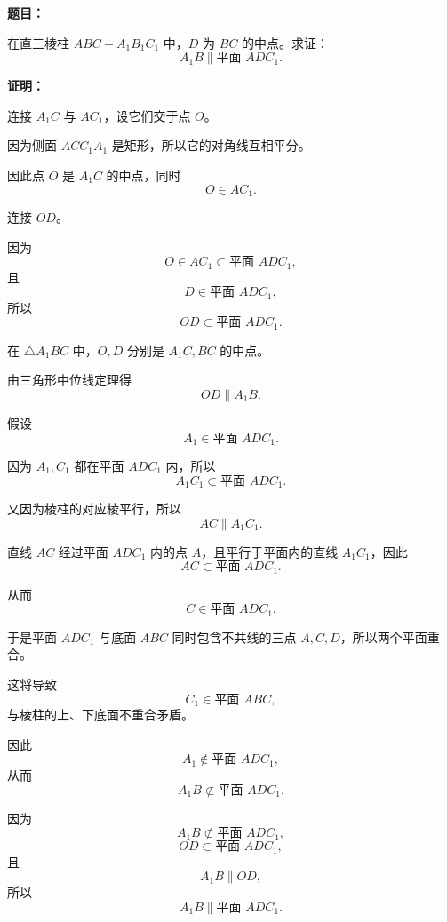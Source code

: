 \begin{examplebox}
	\textbf{题目：}

	在直三棱柱 $ABC-A_1B_1C_1$ 中，$D$ 为 $BC$ 的中点。求证：
	\[
		A_1B\parallel\text{平面 }ADC_1.
	\]

	\textbf{证明：}

	\begin{description}[
			style=nextline,
			leftmargin=2.8em,
			labelsep=0.5em,
			itemsep=0.45em
		]
		\item[\textbf{第一步（构造面内参照线）：}]
		      连接 $A_1C$ 与 $AC_1$，设它们交于点 $O$。

		      因为侧面 $ACC_1A_1$ 是矩形，所以它的对角线互相平分。

		      因此点 $O$ 是 $A_1C$ 的中点，同时
		      \[
			      O\in AC_1.
		      \]

		      连接 $OD$。

		      因为
		      \[
			      O\in AC_1\subset\text{平面 }ADC_1,
		      \]
		      且
		      \[
			      D\in\text{平面 }ADC_1,
		      \]
		      所以
		      \[
			      OD\subset\text{平面 }ADC_1.
		      \]

		\item[\textbf{第二步（证明线线平行）：}]
		      在 $\triangle A_1BC$ 中，$O,D$ 分别是 $A_1C,BC$ 的中点。

		      由三角形中位线定理得
		      \[
			      OD\parallel A_1B.
		      \]

		\item[\textbf{第三步（确认目标线不在平面内）：}]
		      假设
		      \[
			      A_1\in\text{平面 }ADC_1.
		      \]

		      因为 $A_1,C_1$ 都在平面 $ADC_1$ 内，所以
		      \[
			      A_1C_1\subset\text{平面 }ADC_1.
		      \]

		      又因为棱柱的对应棱平行，所以
		      \[
			      AC\parallel A_1C_1.
		      \]

		      直线 $AC$ 经过平面 $ADC_1$ 内的点 $A$，且平行于平面内的直线 $A_1C_1$，因此
		      \[
			      AC\subset\text{平面 }ADC_1.
		      \]

		      从而
		      \[
			      C\in\text{平面 }ADC_1.
		      \]

		      于是平面 $ADC_1$ 与底面 $ABC$ 同时包含不共线的三点 $A,C,D$，所以两个平面重合。

		      这将导致
		      \[
			      C_1\in\text{平面 }ABC,
		      \]
		      与棱柱的上、下底面不重合矛盾。

		      因此
		      \[
			      A_1\notin\text{平面 }ADC_1,
		      \]
		      从而
		      \[
			      A_1B\not\subset\text{平面 }ADC_1.
		      \]

		\item[\textbf{第四步（套用判定定理）：}]
		      因为
		      \[
			      A_1B\not\subset\text{平面 }ADC_1,
		      \]
		      \[
			      OD\subset\text{平面 }ADC_1,
		      \]
		      且
		      \[
			      A_1B\parallel OD,
		      \]
		      所以
		      \[
			      A_1B\parallel\text{平面 }ADC_1.
		      \]
	\end{description}
\end{examplebox}